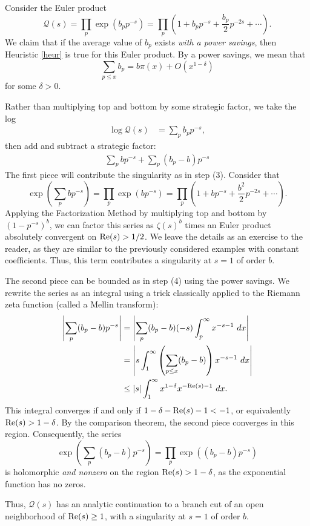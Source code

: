 \documentclass[12pt]{amsart}
\newenvironment{BOXexample}{
\begin{exbox}\mbox{}
\begin{example}
}
{
\end{example}
\end{exbox}
}
\theoremstyle{plain}
\begin{document}
\begin{BOXexample}
Consider the Euler product
\[
\mathcal{Q}(s) = \prod_p \exp(b_pp^{-s}) = \prod_p \left( 1 + b_p p^{-s} + \frac{b_p}{2}p^{-2s} + \cdots \right).
\]
We claim that if the average value of $b_p$ exists \emph{with a power savings}, then Heuristic \ref{heur} is true for this Euler product. By a power savings, we mean that
\[
\sum_{p\le x} b_p = b\pi(x) + O(x^{1-\delta})
\]
for some $\delta > 0$.

Rather than multiplying top and bottom by some strategic factor, we take the log
\begin{align*}
\log\mathcal{Q}(s) &= \sum_p b_p p^{-s},
\end{align*}
then add and subtract a strategic factor:
\begin{align*}
    \sum_p bp^{-s} + \sum_p (b_p-b)p^{-s}
\end{align*}
The first piece will contribute the singularity as in step (3). Consider that
\[
\exp\left(\sum_p b p^{-s}\right) = \prod_p \exp(bp^{-s}) = \prod_p\left(1 + bp^{-s} + \frac{b^2}{2}p^{-2s} + \cdots\right).
\]
Applying the Factorization Method by multiplying top and bottom by $(1-p^{-s})^b$, we can factor this series as $\zeta(s)^b$ times an Euler product absolutely convergent on ${\rm Re}(s) > 1/2$. We leave the details as an exercise to the reader, as they are similar to the previously considered examples with constant coefficients. Thus, this term contributes a singularity at $s=1$ of order $b$.

The second piece can be bounded as in step (4) using the power savings. We rewrite the series as an integral using a trick classically applied to the Riemann zeta function (called a Mellin transform):
\begin{align*}
    \left\lvert\sum_{p} (b_p -b)p^{-s}\right\rvert &= \left\lvert\sum_{p} (b_p -b)(-s)\int_p^{\infty} x^{-s-1}\ dx\right\rvert\\
    &=\left\lvert s\int_1^\infty \left(\sum_{p\le x} (b_p - b)\right)x^{-s-1}\ dx\right\rvert\\
    &\le|s|\int_1^\infty x^{1-\delta}x^{-{\rm Re}(s)-1}\ dx.
\end{align*}
This integral converges if and only if $1-\delta -{\rm Re}(s)-1 < -1$, or equivalently ${\rm Re}(s) > 1-\delta$. By the comparison theorem, the second piece converges in this region. Consequently, the series
\[
\exp\left( \sum_p (b_p - b) p^{-s}\right) = \prod_p \exp((b_p - b)p^{-s})
\]
is holomorphic \emph{and nonzero} on the region ${\rm Re}(s)>1-\delta$, as the exponential function has no zeros.

Thus, $\mathcal{Q}(s)$ has an analytic continuation to a branch cut of an open neighborhood of ${\rm Re}(s) \ge 1$, with a singularity at $s=1$ of order $b$.
\end{BOXexample}
\end{document}
